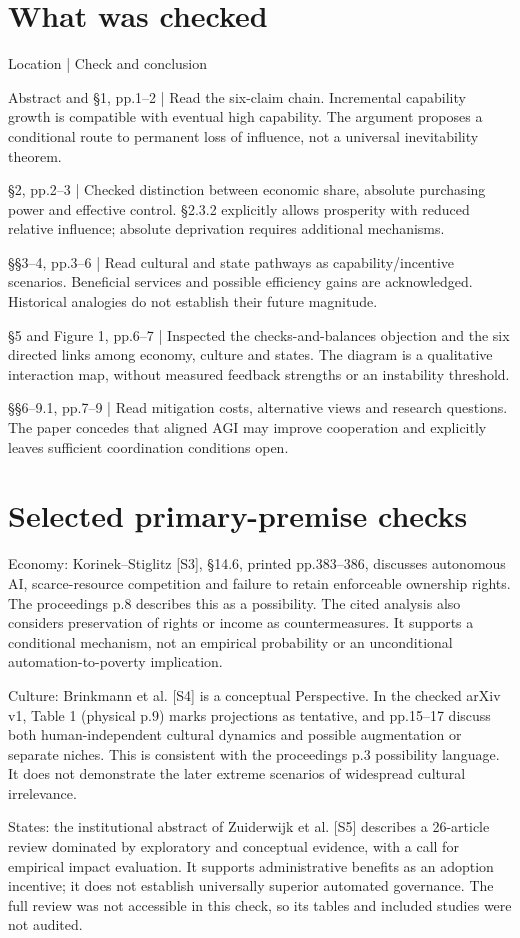 \documentclass[10pt]{article}
\begin{document}
\section*{What was checked}
Location | Check and conclusion\par
Abstract and §1, pp.1–2 | Read the six-claim chain. Incremental capability growth is compatible with eventual high capability. The argument proposes a conditional route to permanent loss of influence, not a universal inevitability theorem.\par
§2, pp.2–3 | Checked distinction between economic share, absolute purchasing power and effective control. §2.3.2 explicitly allows prosperity with reduced relative influence; absolute deprivation requires additional mechanisms.\par
§§3–4, pp.3–6 | Read cultural and state pathways as capability/incentive scenarios. Beneficial services and possible efficiency gains are acknowledged. Historical analogies do not establish their future magnitude.\par
§5 and Figure 1, pp.6–7 | Inspected the checks-and-balances objection and the six directed links among economy, culture and states. The diagram is a qualitative interaction map, without measured feedback strengths or an instability threshold.\par
§§6–9.1, pp.7–9 | Read mitigation costs, alternative views and research questions. The paper concedes that aligned AGI may improve cooperation and explicitly leaves sufficient coordination conditions open.\par
\section*{Selected primary-premise checks}
Economy: Korinek–Stiglitz [S3], §14.6, printed pp.383–386, discusses autonomous AI, scarce-resource competition and failure to retain enforceable ownership rights. The proceedings p.8 describes this as a possibility. The cited analysis also considers preservation of rights or income as countermeasures. It supports a conditional mechanism, not an empirical probability or an unconditional automation-to-poverty implication.\par
Culture: Brinkmann et al. [S4] is a conceptual Perspective. In the checked arXiv v1, Table 1 (physical p.9) marks projections as tentative, and pp.15–17 discuss both human-independent cultural dynamics and possible augmentation or separate niches. This is consistent with the proceedings p.3 possibility language. It does not demonstrate the later extreme scenarios of widespread cultural irrelevance.\par
States: the institutional abstract of Zuiderwijk et al. [S5] describes a 26-article review dominated by exploratory and conceptual evidence, with a call for empirical impact evaluation. It supports administrative benefits as an adoption incentive; it does not establish universally superior automated governance. The full review was not accessible in this check, so its tables and included studies were not audited.\par
\end{document}
